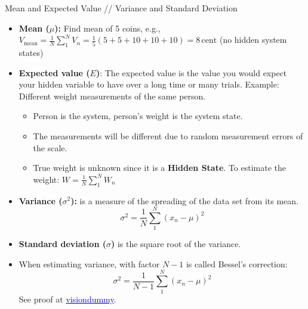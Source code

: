 \begin{frame}{Mean and Expected Value // Variance and Standard Deviation}

\begin{itemize}
    \item \textbf{Mean ($\mu$):} Find mean of 5 coins, e.g., $V_{\text{mean}} = \frac{1}{N}\sum_1^N V_n = \frac{1}{5}  (5+5+10+10+10)=8\,\text{cent}$ (no hidden system states)
    \item \textbf{Expected value ($E$)}: The expected value is the value you would expect your hidden variable to have over a long time or many trials. Example: Different weight measurements of the same person.
    \begin{itemize}
        \item Person is the system, person's weight is the system state.
        \item The measurements will be different due to random measurement errors of the scale.
        \item True weight is unknown since it is a \textbf{Hidden State}. To estimate the weight: $W = \frac{1}{N}\sum_1^N W_n$
    \end{itemize}

    \item \textbf{Variance ($\sigma^2$):} is a measure of the spreading of the data set from its mean. $$\sigma^2 = \frac{1}{N}\sum_1^N (x_n-\mu)^2$$
    \item \textbf{Standard deviation ($\sigma$)} is the square root of the variance. 

    \item When estimating variance, with factor $N-1$ is called Bessel's correction:
    $$\sigma^2 = \frac{1}{N-1}\sum_1^N (x_n-\mu)^2$$
    See proof at   \href{https://www.visiondummy.com/2014/03/divide-variance-n-1/}{\textcolor{blue}{visiondummy}}.
    
      
\end{itemize}


\end{frame}


